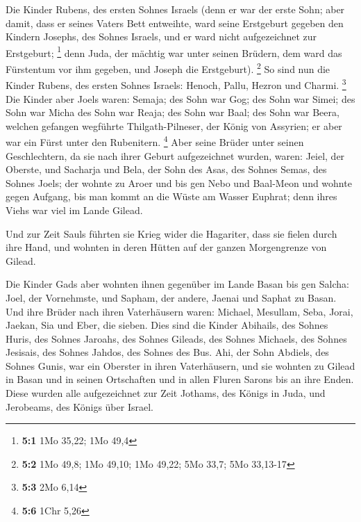  Die Kinder Rubens, des ersten Sohnes Israels (denn er war
der erste Sohn; aber damit, dass er seines Vaters Bett entweihte, ward
seine Erstgeburt gegeben den Kindern Josephs, des Sohnes Israels, und er
ward nicht aufgezeichnet zur Erstgeburt; \footnote{\textbf{5:1} 1Mo
  35,22; 1Mo 49,4}  denn Juda, der mächtig war unter
seinen Brüdern, dem ward das Fürstentum vor ihm gegeben, und Joseph die
Erstgeburt). \footnote{\textbf{5:2} 1Mo 49,8; 1Mo 49,10; 1Mo 49,22; 5Mo
  33,7; 5Mo 33,13-17}  So sind nun die Kinder Rubens, des
ersten Sohnes Israels: Henoch, Pallu, Hezron und Charmi. \footnote{\textbf{5:3}
  2Mo 6,14}  Die Kinder aber Joels waren: Semaja; des Sohn
war Gog; des Sohn war Simei;  des Sohn war Micha des Sohn
war Reaja; des Sohn war Baal;  des Sohn war Beera, welchen
gefangen wegführte Thilgath-Pilneser, der König von Assyrien; er aber
war ein Fürst unter den Rubenitern. \footnote{\textbf{5:6} 1Chr 5,26}
 Aber seine Brüder unter seinen Geschlechtern, da sie nach
ihrer Geburt aufgezeichnet wurden, waren: Jeiel, der Oberste, und
Sacharja  und Bela, der Sohn des Asas, des Sohnes Semas,
des Sohnes Joels; der wohnte zu Aroer und bis gen Nebo und Baal-Meon
 und wohnte gegen Aufgang, bis man kommt an die Wüste am
Wasser Euphrat; denn ihres Viehs war viel im Lande Gilead.

 Und zur Zeit Sauls führten sie Krieg wider die
Hagariter, dass sie fielen durch ihre Hand, und wohnten in deren Hütten
auf der ganzen Morgengrenze von Gilead.

 Die Kinder Gads aber wohnten ihnen gegenüber im Lande
Basan bis gen Salcha:  Joel, der Vornehmste, und Sapham,
der andere, Jaenai und Saphat zu Basan.  Und ihre Brüder
nach ihren Vaterhäusern waren: Michael, Mesullam, Seba, Jorai, Jaekan,
Sia und Eber, die sieben.  Dies sind die Kinder Abihails,
des Sohnes Huris, des Sohnes Jaroahs, des Sohnes Gileads, des Sohnes
Michaels, des Sohnes Jesisais, des Sohnes Jahdos, des Sohnes des Bus.
 Ahi, der Sohn Abdiels, des Sohnes Gunis, war ein
Oberster in ihren Vaterhäusern,  und sie wohnten zu
Gilead in Basan und in seinen Ortschaften und in allen Fluren Sarons bis
an ihre Enden.  Diese wurden alle aufgezeichnet zur Zeit
Jothams, des Königs in Juda, und Jerobeams, des Königs über Israel.

